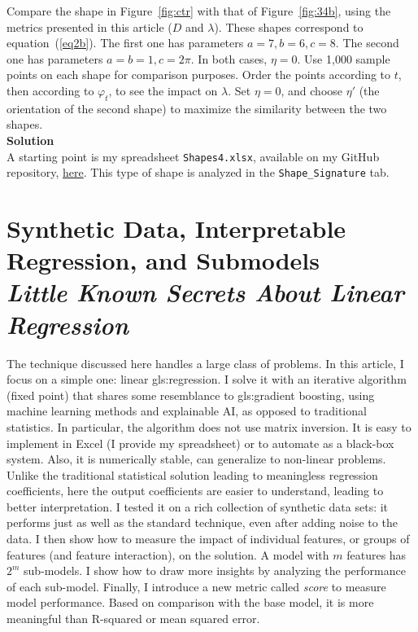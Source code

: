 \documentclass[oneside,10pt]{book}
\newcommand\Chapter[2]{
  \chapter[#1]{#1\\[2ex]\Large\itshape#2}
}
\begin{document}
\begin{Exercise}Compare the shape in Figure~\ref{fig:ctr} with that of Figure~\ref{fig:34b}, using the metrics presented in this article ($D$ and $\lambda$). These shapes correspond to equation~(\ref{eq2b}). The first one has parameters $a=7,b=6,c=8$. The second one has parameters $a=b=1,c=2\pi$. In both cases, $\eta=0$. Use 1,000 sample points on each shape for comparison purposes. Order the points according to $t$, then according to $\varphi_t$, to see the impact on $\lambda$. Set $\eta=0$, and choose $\eta'$ (the orientation of the second shape) to maximize the similarity between the two shapes. \vspace{1ex} \\
{\bf Solution} \vspace{1ex} \\
A starting point is my spreadsheet \texttt{Shapes4.xlsx}, available on my GitHub repository, \href{https://github.com/VincentGranville/Machine-Learning/blob/main/Spreadsheets/README.md}{here}. This type of shape is analyzed in the \texttt{Shape\_Signature} tab. 
\end{Exercise}

\Chapter{Synthetic Data, Interpretable Regression, and Submodels}{Little Known Secrets About Linear Regression}\label{chapterregression}

The technique discussed here handles a large class of problems. In this article, I focus on a simple one: linear \gls{gls:regression}. I solve it with an iterative algorithm (fixed point) that shares some resemblance to \gls{gls:gradient} boosting, using machine learning methods and explainable AI, as opposed to traditional statistics. In particular, the algorithm does not use matrix inversion. It is easy to implement in Excel (I provide my spreadsheet) or to automate as a black-box system. Also, it is numerically stable, can generalize to non-linear problems. Unlike the traditional statistical solution leading to meaningless regression coefficients, here the output coefficients are easier to understand, leading to better interpretation. I tested it on a rich collection of synthetic data sets: it performs just as well as the standard technique, even after adding noise to the data. I then show how to measure the impact of individual features, or groups of features (and feature interaction), on the solution. A model with $m$ features has $2^m$ sub-models. I show how to draw more insights by analyzing the performance of each sub-model. Finally, I introduce a new metric called {\em score} to measure model performance. Based on comparison with the base model, it is more meaningful than R-squared or mean squared error.
\end{document}
